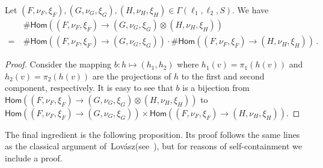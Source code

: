 \documentclass[authorcolumns,numberwithinsect]{no-lipics-v2022}
\newcommand{\homs}[2]{\mathsf{Hom}(#1 \to #2)}
\newcommand{\lovasz}{Lov{\'{a}}sz}
\begin{document}
\begin{proposition}\label{prop:linear}
     Let $(F,\nu_F,\xi_F),(G,\nu_G,\xi_G),(H,\nu_H,\xi_H) \in \Gamma(\ell_1,\ell_2,S)$. We have 
     \begin{align*}
         ~&~\#\homs{(F,\nu_F,\xi_F)}{(G,\nu_G,\xi_G)\otimes (H,\nu_H,\xi_H)} \\
         =&~\#\homs{(F,\nu_F,\xi_F)}{(G,\nu_G,\xi_G)} \cdot \#\homs{(F,\nu_F,\xi_F)}{(H,\nu_H,\xi_H)}\,. 
     \end{align*}
\end{proposition}
\begin{proof}
   Consider the mapping $b: h \mapsto (h_1,h_2)$ where $h_1(v)=\pi_1(h(v))$ and $h_2(v)=\pi_2(h(v))$ are the projections of $h$ to the first and second component, respectively. It is easy to see that $b$ is a bijection from $\homs{(F,\nu_F,\xi_F)}{(G,\nu_G,\xi_G)\otimes (H,\nu_H,\xi_H)}$ to  $\homs{(F,\nu_F,\xi_F)}{(G,\nu_G,\xi_G)} \times \homs{(F,\nu_F,\xi_F)}{(H,\nu_H,\xi_H)}$.
\end{proof}

The final ingredient is the following proposition. Its  proof follows the same lines as the classical argument of~\lovasz (see~\cite[Chapter 5.4]{Lovasz12}), but for reasons of self-containment we include a proof.
\end{document}
